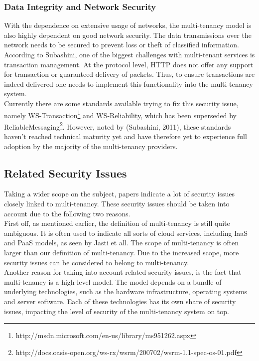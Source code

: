\subsubsection{Data Integrity and Network Security}
With the dependence on extensive usage of networks, the multi-tenancy model is also highly dependent on good network security.  The data transmissions over the network needs to be secured to prevent loss or theft of classified information. According to Subashini\cite{Subashini2011Security}, one of the biggest challenges with multi-tenant services is transaction management. At the protocol level, HTTP does not offer any support for transaction or guaranteed delivery of packets. Thus, to ensure transactions are indeed delivered one needs to implement this functionality into the multi-tenancy system.\\
	Currently there are some standards available trying to fix this security issue, namely WS-Transaction\footnote{http://msdn.microsoft.com/en-us/library/ms951262.aspx} and WS-Reliability, which has been superseded by ReliableMessaging\footnote{http://docs.oasis-open.org/ws-rx/wsrm/200702/wsrm-1.1-spec-os-01.pdf}. However, noted by (Subashini, 2011), these standards haven’t reached technical maturity yet and have therefore yet to experience full adoption by the majority of the multi-tenancy providers.

\subsection{Related Security Issues}
Taking a wider scope on the subject, papers indicate a lot of security issues closely linked to multi-tenancy. These security issues should be taken into account due to the following two reasons.\\
First off, as mentioned earlier, the definition of multi-tenancy is still quite ambiguous. It is often used to indicate all sorts of cloud services, including IaaS and PaaS models, as seen by Jasti et all\cite{Jasti2010Security}. The scope of multi-tenancy is often larger than our definition of multi-tenancy. Due to the increased scope, more security issues can be considered to belong to multi-tenancy. \\
Another reason for taking into account related security issues, is the fact that multi-tenancy is a high-level model. The model depends on a bundle of underlying technologies, such as the hardware infrastructure, operating systems and server software. Each of these technologies has its own share of security issues, impacting the level of security of the multi-tenancy system on top. 

